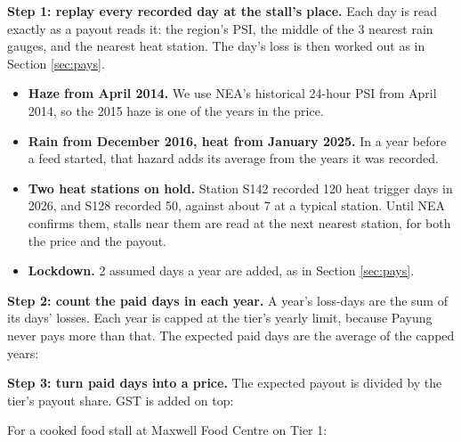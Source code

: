 \documentclass[11pt,a4paper]{article}
\begin{document}
\textbf{Step 1: replay every recorded day at the stall's place.} Each day is read exactly as a payout reads it: the region's PSI, the middle of the 3 nearest rain gauges, and the nearest heat station. The day's loss is then worked out as in Section \ref{sec:pays}.
\begin{itemize}[leftmargin=1.2em]
  \item \textbf{Haze from April 2014.} We use NEA's historical 24-hour PSI from April 2014, so the 2015 haze is one of the years in the price.
  \item \textbf{Rain from December 2016, heat from January 2025.} In a year before a feed started, that hazard adds its average from the years it was recorded.
  \item \textbf{Two heat stations on hold.} Station S142 recorded 120 heat trigger days in 2026, and S128 recorded 50, against about 7 at a typical station. Until NEA confirms them, stalls near them are read at the next nearest station, for both the price and the payout.
  \item \textbf{Lockdown.} 2 assumed days a year are added, as in Section \ref{sec:pays}.
\end{itemize}

\textbf{Step 2: count the paid days in each year.} A year's loss-days are the sum of its days' losses. Each year is capped at the tier's yearly limit, because Payung never pays more than that. The expected paid days are the average of the capped years:
\begin{center}
\end{center}

\textbf{Step 3: turn paid days into a price.} The expected payout is divided by the tier's payout share. GST is added on top:
\begin{center}
\end{center}

For a cooked food stall at Maxwell Food Centre on Tier 1:
\end{document}
